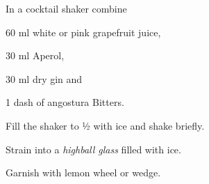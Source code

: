 \startsection[title={Pretty in Pink},reference=prettyinpink]
\startitemize
\item In a cocktail shaker combine
      \startitemize
      \item 60 ml white or pink grapefruit juice,
      \item 30 ml Aperol,
      \item 30 ml dry gin and
      \item 1 dash of angostura Bitters.
      \stopitemize
\item Fill the shaker to ½ with ice and shake briefly.
\item Strain into a {\em highball glass} filled with ice.
\item Garnish with \tr lemon wheel or wedge.
\stopitemize
